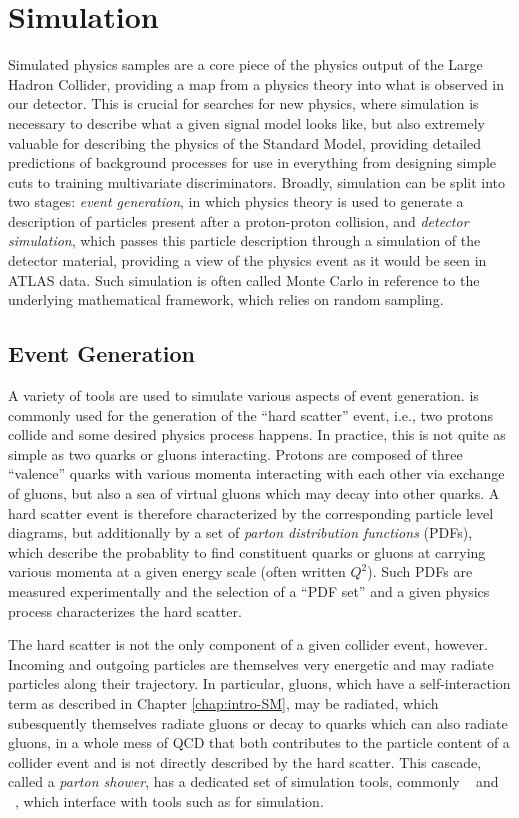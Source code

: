 \chapter{Simulation}
\label{chap:simulation}

Simulated physics samples are a core piece of the physics output of the Large Hadron Collider, 
providing a map from a physics theory into what is observed in our detector. This is crucial for 
searches for new physics, where simulation is necessary to describe what a given signal model looks 
like, but also extremely valuable for describing the physics of the Standard Model, providing detailed 
predictions of background processes for use in everything from designing simple cuts to training 
multivariate discriminators. Broadly, simulation can be split into two stages: \emph{event generation}, in which 
physics theory is used to generate a description of particles present after a proton-proton collision, and 
\emph{detector simulation}, which passes this particle description through a simulation of the detector 
material, providing a view of the physics event as it would be seen in ATLAS data. Such simulation 
is often called Monte Carlo in reference to the underlying mathematical framework, which relies on random 
sampling. 

\section{Event Generation}
A variety of tools are used to simulate various aspects of event generation. \MADGRAPH\cite{MG5} 
is commonly used for the generation of the ``hard scatter'' event, i.e., two protons collide and 
some desired physics process happens. In practice, this is not quite as simple as two quarks or 
gluons interacting. Protons are composed of three ``valence'' quarks with various momenta interacting 
with each other via exchange of gluons, but also a sea of virtual gluons which may decay into other
quarks. A hard scatter event is therefore characterized by the corresponding particle level 
diagrams, but additionally by a set of \emph{parton distribution functions} (PDFs), which describe the 
probablity to find constituent quarks or gluons at carrying various momenta at a given energy 
scale (often written $Q^2$). Such PDFs are measured experimentally  and the selection 
of a ``PDF set'' and a given physics process characterizes the hard scatter.

The hard scatter is not the only component of a given collider event, however. Incoming and outgoing 
particles are themselves very energetic and may radiate particles along their trajectory. In particular,
gluons, which have a self-interaction term as described in Chapter \ref{chap:intro-SM}, may be radiated,  
which subesquently themselves radiate gluons or decay to quarks which can also radiate gluons, in a 
whole mess of QCD that both contributes to the particle content of a collider event and is not directly 
described by the hard scatter. This cascade, called a \emph{parton shower}, has a dedicated set of simulation
tools, commonly ~\cite{Herwig7}\cite{HerwigPP} and ~\cite{Pythia}, which interface with 
tools such as \MADGRAPH for simulation. 

